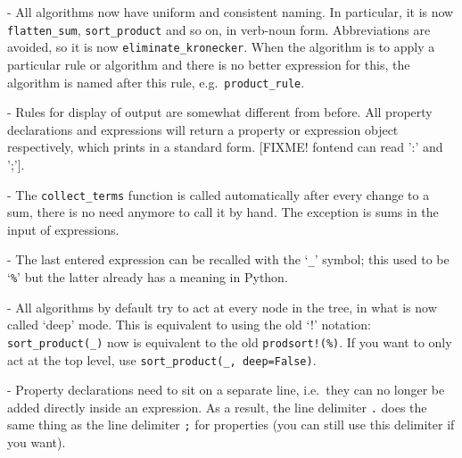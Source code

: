 
- All algorithms now have uniform and consistent naming. In
particular, it is now \verb|flatten_sum|, \verb|sort_product| and so
on, in verb-noun form. Abbreviations are avoided, so it is now
\verb|eliminate_kronecker|. When the algorithm is to apply a
particular rule or algorithm and there is no better expression for
this, the algorithm is named after this rule, e.g.~\verb|product_rule|.

- Rules for display of output are somewhat different from before. All
property declarations and expressions will return a property or
expression object respectively, which prints in a standard form.
[FIXME! fontend can read ':' and ';'].

- The \verb|collect_terms| function is called automatically after
every change to a sum, there is no need anymore to call it by hand.
The exception is sums in the input of expressions.

- The last entered expression can be recalled with the `\verb|_|'
symbol; this used to be `\verb|%|' but the latter already has a
meaning in Python. 

- All algorithms by default try to act at every node in the tree, in
what is now called `deep' mode. This is equivalent to using the old
`!' notation: \verb|sort_product(_)| now is equivalent to the old
\verb|prodsort!(%)|. If you want to only act at the top level, use
\verb|sort_product(_, deep=False)|.

- Property declarations need to sit on a separate line, i.e.~they can
  no longer be added directly inside an expression. As a result, the
  line delimiter \verb|.| does the same thing as the line
  delimiter \verb|;| for properties (you can still use this delimiter
  if you want).
